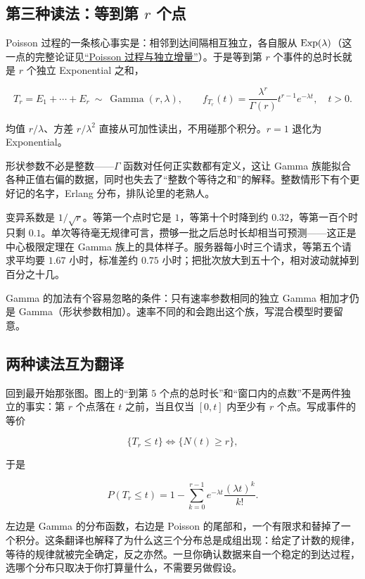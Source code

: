 \subsection{第三种读法：等到第 \texorpdfstring{\(r\)}{r} 个点}

Poisson 过程的一条核心事实是：相邻到达间隔相互独立，各自服从 \(\operatorname{Exp}(\lambda)\)（这一点的完整论证见\hyperref[sec:06-Random-Processes/02-Counting-Processes/02]{``Poisson 过程与独立增量''}）。于是等到第 \(r\) 个事件的总时长就是 \(r\) 个独立 Exponential 之和，

\[
T_r=E_1+\cdots+E_r\ \sim\ \operatorname{Gamma}(r,\lambda),\qquad
f_{T_r}(t)=\frac{\lambda^r}{\Gamma(r)}t^{r-1}e^{-\lambda t},\quad t>0.
\]

均值 \(r/\lambda\)、方差 \(r/\lambda^2\) 直接从可加性读出，不用碰那个积分。\(r=1\) 退化为 Exponential。

形状参数不必是整数——\(\Gamma\) 函数对任何正实数都有定义，这让 Gamma 族能拟合各种正值右偏的数据，同时也失去了``整数个等待之和''的解释。整数情形下有个更好记的名字，Erlang 分布，排队论里的老熟人。

变异系数是 \(1/\sqrt r\)。等第一个点时它是 \(1\)，等第十个时降到约 \(0.32\)，等第一百个时只剩 \(0.1\)。单次等待毫无规律可言，攒够一批之后总时长却相当可预测——这正是中心极限定理在 Gamma 族上的具体样子。服务器每小时三个请求，等第五个请求平均要 \(1.67\) 小时，标准差约 \(0.75\) 小时；把批次放大到五十个，相对波动就掉到百分之十几。

Gamma 的加法有个容易忽略的条件：只有速率参数相同的独立 Gamma 相加才仍是 Gamma（形状参数相加）。速率不同的和会跑出这个族，写混合模型时要留意。

\subsection{两种读法互为翻译}

回到最开始那张图。图上的``到第 \(5\) 个点的总时长''和``窗口内的点数''不是两件独立的事实：第 \(r\) 个点落在 \(t\) 之前，当且仅当 \([0,t]\) 内至少有 \(r\) 个点。写成事件的等价

\[
\{T_r\le t\}\iff\{N(t)\ge r\},
\]

于是

\[
P(T_r\le t)=1-\sum_{k=0}^{r-1}e^{-\lambda t}\frac{(\lambda t)^k}{k!}.
\]

左边是 Gamma 的分布函数，右边是 Poisson 的尾部和，一个有限求和替掉了一个积分。这条翻译也解释了为什么这三个分布总是成组出现：给定了计数的规律，等待的规律就被完全确定，反之亦然。一旦你确认数据来自一个稳定的到达过程，选哪个分布只取决于你打算量什么，不需要另做假设。

